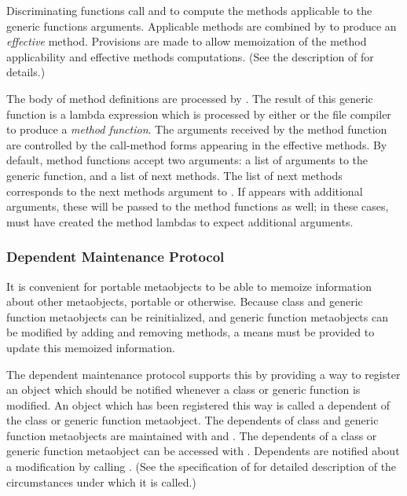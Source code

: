 Discriminating functions call  and
 to compute the methods applicable to
the generic functions arguments. Applicable methods are combined by
 to produce an \emph{effective} method. Provisions are made to
allow memoization of the method applicability and effective methods
computations. (See the description of  for
details.) 

The body of method definitions are processed by . The
result of this generic function is a lambda expression which is processed by
either  or the file compiler to produce a \emph{method
  function}. The arguments received by the method function are controlled by the
call-method forms appearing in the effective methods. By default, method
functions accept two arguments: a list of arguments to the generic function, and
a list of next methods. The list of next methods corresponds to the next methods
argument to . If  appears with additional arguments,
these will be passed to the method functions as well; in these cases,
 must have created the method lambdas to expect
additional arguments.

\subsubsection{Dependent Maintenance Protocol}
\label{DEPENDENT-MAINTENANCE-PROTOCOL}

It is convenient for portable metaobjects to be able to memoize information
about other metaobjects, portable or otherwise. Because class and generic
function metaobjects can be reinitialized, and generic function metaobjects can
be modified by adding and removing methods, a means must be provided to update
this memoized information. 

The dependent maintenance protocol supports this by providing a way to register
an object which should be notified whenever a class or generic function is
modified. An object which has been registered this way is called a dependent of
the class or generic function metaobject. The dependents of class and generic
function metaobjects are maintained with  and
. The dependents of a class or generic function metaobject
can be accessed with . Dependents are notified about a
modification by calling . (See the specification of
 for detailed description of the circumstances under which
it is called.)

